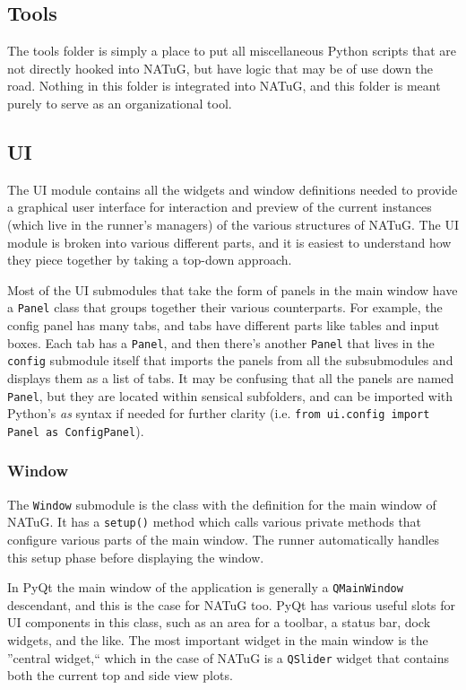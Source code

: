 \documentclass[titlepage]{article}
\begin{document}
	\subsection{Tools}
	The tools folder is simply a place to put all miscellaneous Python scripts that are not directly hooked into NATuG, but have logic that may be of use down the road. Nothing in this folder is integrated into NATuG, and this folder is meant purely to serve as an organizational tool.
	
	\subsection{UI}
	The UI module contains all the widgets and window definitions needed to provide a graphical user interface for interaction and preview of the current instances (which live in the runner's managers) of the various structures of NATuG. The UI module is broken into various different parts, and it is easiest to understand how they piece together by taking a top-down approach.
	
	Most of the UI submodules that take the form of panels in the main window have a \texttt{Panel} class that groups together their various counterparts. For example, the config panel has many tabs, and tabs have different parts like tables and input boxes. Each tab has a \texttt{Panel}, and then there's another \texttt{Panel} that lives in the \texttt{config} submodule itself that imports the panels from all the subsubmodules and displays them as a list of tabs. It may be confusing that all the panels are named \texttt{Panel}, but they are located within sensical subfolders, and can be imported with Python's \textit{as} syntax if needed for further clarity (i.e. \texttt{from ui.config import Panel as ConfigPanel}).
	
	\subsubsection{Window}
	The \texttt{Window} submodule is the class with the definition for the main window of NATuG. It has a \texttt{setup()} method which calls various private methods that configure various parts of the main window. The runner automatically handles this setup phase before displaying the window.
	
	In PyQt the main window of the application is generally a \texttt{QMainWindow} descendant, and this is the case for NATuG too. PyQt has various useful slots for UI components in this class, such as an area for a toolbar, a status bar, dock widgets, and the like. The most important widget in the main window is the ''central widget,`` which in the case of NATuG is a \texttt{QSlider} widget that contains both the current top and side view plots.
	
\end{document}
